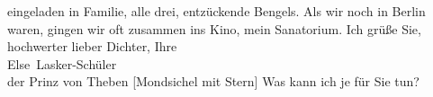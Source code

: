 \begin{ledgroupsized}[t]{13cm}
               eingeladen in Familie, alle drei, entzückende Bengels. Als wir noch in Berlin waren, gingen wir oft zusammen ins Kino,
               mein Sanatorium. Ich grüße Sie, hochwerter lieber Dichter, Ihre {\\}\spacefill\mbox{Else Lasker-Schüler}{ }{\\}der Prinz von Theben {[}Mondsichel mit
                  Stern{]}\pend
           \pstart
           \noindent{}Was kann ich je für Sie tun?\pend
           \pstart
           {\pb}\label{T_L02653-1v}\label{T_L02653-1h}\pend
           
         
         \endnumbering{}\end{ledgroupsized}  \newcommand{\dateiname}{L02653}\newcommand{\titel}{Else Lasker-Schüler an Arthur Schnitzler, 10. 12. 1924}\newcommand{\editorInnen}{Martin Anton Müller und Laura Untner}
      